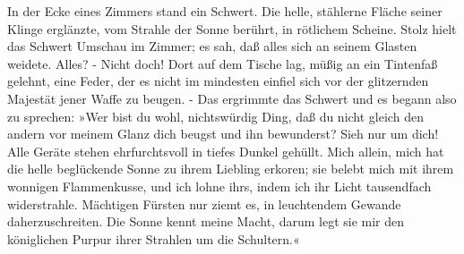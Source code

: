 In der Ecke eines Zimmers stand ein Schwert. Die helle, stählerne Fläche seiner
Klinge erglänzte, vom Strahle der Sonne berührt, in rötlichem Scheine. Stolz
hielt das Schwert Umschau im Zimmer; es sah, daß alles sich an seinem Glasten
weidete. Alles? - Nicht doch! Dort auf dem Tische lag, müßig an ein Tintenfaß
gelehnt, eine Feder, der es nicht im mindesten einfiel sich vor der
glitzernden Majestät jener Waffe zu beugen. - Das ergrimmte das Schwert und es
begann also zu sprechen: »Wer bist du wohl, nichtswürdig Ding, daß du nicht
gleich den andern vor meinem Glanz dich beugst und ihn bewunderst? Sieh nur
um dich! Alle Geräte stehen ehrfurchtsvoll in tiefes Dunkel gehüllt. Mich
allein, mich hat die helle beglückende Sonne zu ihrem Liebling erkoren; sie
belebt mich mit ihrem wonnigen Flammenkusse, und ich lohne ihrs, indem ich ihr
Licht tausendfach widerstrahle. Mächtigen Fürsten nur ziemt es, in leuchtendem
Gewande daherzuschreiten. Die Sonne kennt meine Macht, darum legt sie mir den
königlichen Purpur ihrer Strahlen um die Schultern.«


